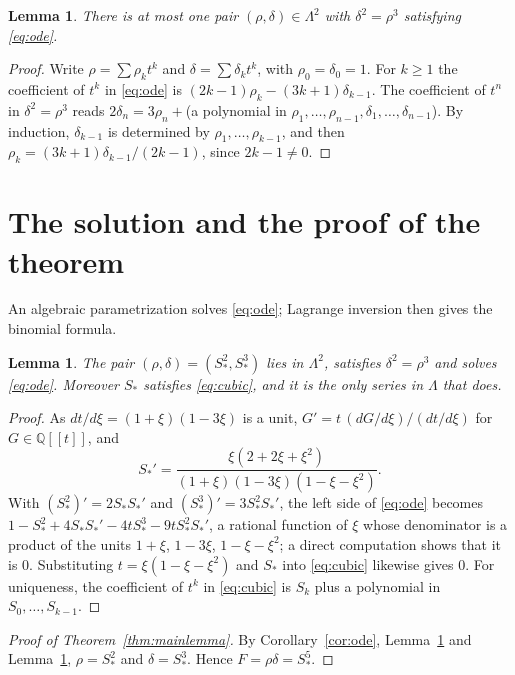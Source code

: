 \documentclass[11pt]{article}
\newtheorem{lemma}[theorem]{Lemma}
\theoremstyle{definition}
\theoremstyle{remark}
\numberwithin{equation}{section}
\newcommand{\Q}{\mathbb{Q}}
\newcommand{\ps}[1]{\Q[\![#1]\!]}
\newcommand{\Sst}{S_{*}}
\begin{document}
\begin{lemma}\label{lem:unique}
There is at most one pair $(\rho,\delta)\in\Lambda^2$ with $\delta^2=\rho^3$
satisfying \eqref{eq:ode}.
\end{lemma}

\begin{proof}
Write $\rho=\sum\rho_kt^k$ and $\delta=\sum\delta_kt^k$, with
$\rho_0=\delta_0=1$. For $k\geq1$ the coefficient of $t^k$ in
\eqref{eq:ode} is $(2k-1)\rho_k-(3k+1)\delta_{k-1}$. The coefficient of
$t^n$ in $\delta^2=\rho^3$ reads $2\delta_n=3\rho_n+{}$(a polynomial in
$\rho_1,\dots,\rho_{n-1},\delta_1,\dots,\delta_{n-1}$). By induction,
$\delta_{k-1}$ is determined by $\rho_1,\dots,\rho_{k-1}$, and then
$\rho_k=(3k+1)\delta_{k-1}/(2k-1)$, since $2k-1\neq0$.
\end{proof}

\section{The solution and the proof of the theorem}\label{sec:solution}

An algebraic parametrization solves \eqref{eq:ode}; Lagrange inversion
then gives the binomial formula.

\begin{lemma}\label{lem:solution}
The pair $(\rho,\delta)=(\Sst^2,\Sst^3)$ lies in $\Lambda^2$, satisfies
$\delta^2=\rho^3$ and solves \eqref{eq:ode}. Moreover $\Sst$ satisfies
\eqref{eq:cubic}, and it is the only series in $\Lambda$ that does.
\end{lemma}

\begin{proof}
As $dt/d\xi=(1+\xi)(1-3\xi)$ is a unit, $G'=t\,(dG/d\xi)/(dt/d\xi)$ for
$G\in\ps{t}$, and
\[
  \Sst'=\frac{\xi(2+2\xi+\xi^2)}{(1+\xi)(1-3\xi)(1-\xi-\xi^2)} .
\]
With $(\Sst^2)'=2\Sst\Sst'$ and $(\Sst^3)'=3\Sst^2\Sst'$, the left side of
\eqref{eq:ode} becomes $1-\Sst^2+4\Sst\Sst'-4t\Sst^3-9t\Sst^2\Sst'$, a
rational function of $\xi$ whose denominator is a product of the units
$1+\xi$, $1-3\xi$, $1-\xi-\xi^2$; a direct computation shows that it is
$0$. Substituting $t=\xi(1-\xi-\xi^2)$ and $\Sst$ into \eqref{eq:cubic}
likewise gives $0$. For uniqueness, the coefficient of $t^k$ in
\eqref{eq:cubic} is $S_k$ plus a polynomial in $S_0,\dots,S_{k-1}$.
\end{proof}



\begin{proof}[Proof of Theorem~\ref{thm:mainlemma}]
By Corollary~\ref{cor:ode}, Lemma~\ref{lem:solution} and
Lemma~\ref{lem:unique}, $\rho=\Sst^2$ and $\delta=\Sst^3$. Hence
$F=\rho\delta=\Sst^5$.
\end{proof}
\end{document}
